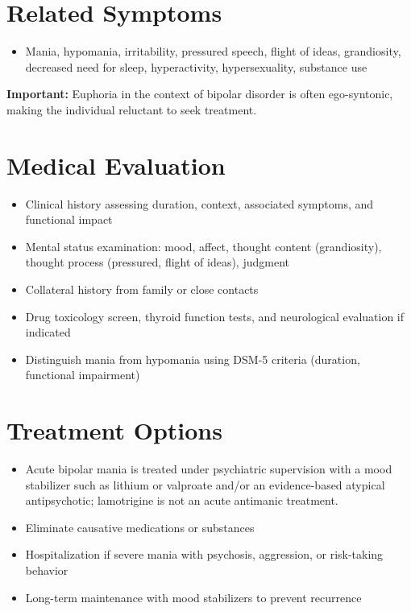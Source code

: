 \section*{Related Symptoms}
\begin{itemize}
  \item Mania, hypomania, irritability, pressured speech, flight of ideas, grandiosity, decreased need for sleep, hyperactivity, hypersexuality, substance use
\end{itemize}
\textbf{Important:} Euphoria in the context of bipolar disorder is often ego-syntonic, making the individual reluctant to seek treatment.

\section*{Medical Evaluation}
\begin{itemize}
  \item Clinical history assessing duration, context, associated symptoms, and functional impact
  \item Mental status examination: mood, affect, thought content (grandiosity), thought process (pressured, flight of ideas), judgment
  \item Collateral history from family or close contacts
  \item Drug toxicology screen, thyroid function tests, and neurological evaluation if indicated
  \item Distinguish mania from hypomania using DSM-5 criteria (duration, functional impairment)
\end{itemize}

\section*{Treatment Options}
\begin{itemize}
  \item Acute bipolar mania is treated under psychiatric supervision with a mood stabilizer such as lithium or valproate and/or an evidence-based atypical antipsychotic; lamotrigine is not an acute antimanic treatment.
  \item Eliminate causative medications or substances
  \item Hospitalization if severe mania with psychosis, aggression, or risk-taking behavior
  \item Long-term maintenance with mood stabilizers to prevent recurrence
\end{itemize}

